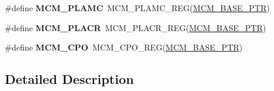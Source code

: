 \begin{DoxyCompactItemize}
\#define {\bfseries M\+C\+M\+\_\+\+P\+L\+A\+MC}~M\+C\+M\+\_\+\+P\+L\+A\+M\+C\+\_\+\+R\+EG(\hyperlink{group___m_c_m___peripheral_gad41e931f176c230831e3dbad45117841}{M\+C\+M\+\_\+\+B\+A\+S\+E\+\_\+\+P\+TR})
\item 
\mbox{\label{group___m_c_m___register___accessor___macros_gaa410b4b505027d7ff0aab20f87e2c2a5}} 
\#define {\bfseries M\+C\+M\+\_\+\+P\+L\+A\+CR}~M\+C\+M\+\_\+\+P\+L\+A\+C\+R\+\_\+\+R\+EG(\hyperlink{group___m_c_m___peripheral_gad41e931f176c230831e3dbad45117841}{M\+C\+M\+\_\+\+B\+A\+S\+E\+\_\+\+P\+TR})
\item 
\mbox{\label{group___m_c_m___register___accessor___macros_ga96a3cf196007edffa1d1ee83717073da}} 
\#define {\bfseries M\+C\+M\+\_\+\+C\+PO}~M\+C\+M\+\_\+\+C\+P\+O\+\_\+\+R\+EG(\hyperlink{group___m_c_m___peripheral_gad41e931f176c230831e3dbad45117841}{M\+C\+M\+\_\+\+B\+A\+S\+E\+\_\+\+P\+TR})
\end{DoxyCompactItemize}


\subsection{Detailed Description}
